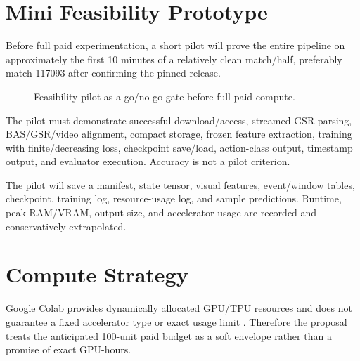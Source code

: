 \documentclass[11pt,a4paper]{article}
\begin{document}
\section{Mini Feasibility Prototype}
Before full paid experimentation, a short pilot will prove the entire pipeline on approximately the first 10 minutes of a relatively clean match/half, preferably match 117093 after confirming the pinned release.

\begin{figure}[H]
\centering
{}
\caption{Feasibility pilot as a go/no-go gate before full paid compute.}
\end{figure}

The pilot must demonstrate successful download/access, streamed GSR parsing, BAS/GSR/video alignment, compact storage, frozen feature extraction, training with finite/decreasing loss, checkpoint save/load, action-class output, timestamp output, and evaluator execution. Accuracy is not a pilot criterion.

The pilot will save a manifest, state tensor, visual features, event/window tables, checkpoint, training log, resource-usage log, and sample predictions. Runtime, peak RAM/VRAM, output size, and accelerator usage are recorded and conservatively extrapolated.

\section{Compute Strategy}
Google Colab provides dynamically allocated GPU/TPU resources and does not guarantee a fixed accelerator type or exact usage limit \citep{googlecolab2026}. Therefore the proposal treats the anticipated 100-unit paid budget as a soft envelope rather than a promise of exact GPU-hours.
\end{document}
